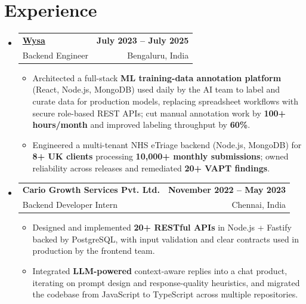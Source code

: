 \documentclass[letterpaper,10pt]{article}
\makeatletter
\newcommand{\resumeItem}[1]{
  \item\small{#1\vspace{-1pt}}
}
\newcommand{\resumeSubheading}[4]{
  \vspace{1pt}\item
    \begin{tabular*}{0.985\textwidth}[t]{l@{\extracolsep{\fill}}r}
      \textbf{#1} & \textbf{\small #2} \\
      {\small\color{ResumeSlate} #3} & {\small\color{ResumeSlate} #4} \\
    \end{tabular*}\vspace{-6pt}
}
\newcommand{\resumeSubHeadingListStart}{\begin{itemize}[leftmargin=0.0in, label={}, itemsep=2pt, topsep=2pt]}
\newcommand{\resumeSubHeadingListEnd}{\end{itemize}}
\newcommand{\resumeItemListStart}{\begin{itemize}[leftmargin=0.18in, itemsep=2pt, topsep=1pt]}
\newcommand{\resumeItemListEnd}{\end{itemize}\vspace{-4pt}}
\makeatother
\begin{document}
\section{Experience}
\resumeSubHeadingListStart
  \resumeSubheading
    {\href{https://www.wysa.io}{Wysa}}{July 2023 -- July 2025}
    {Backend Engineer}{Bengaluru, India}
    \resumeItemListStart
      \resumeItem{Architected a full-stack \textbf{ML training-data annotation platform} (React, Node.js, MongoDB) used daily by the AI team to label and curate data for production models, replacing spreadsheet workflows with secure role-based REST APIs; cut manual annotation work by \textbf{100+ hours/month} and improved labeling throughput by \textbf{60\%}.}
      \resumeItem{Engineered a multi-tenant NHS eTriage backend (Node.js, MongoDB) for \textbf{8+ UK clients} processing \textbf{10{,}000+ monthly submissions}; owned reliability across releases and remediated \textbf{20+ VAPT findings}.}
    \resumeItemListEnd
  \resumeSubheading
    {Cario Growth Services Pvt. Ltd.}{November 2022 -- May 2023}
    {Backend Developer Intern}{Chennai, India}
    \resumeItemListStart
      \resumeItem{Designed and implemented \textbf{20+ RESTful APIs} in Node.js + Fastify backed by PostgreSQL, with input validation and clear contracts used in production by the frontend team.}
      \resumeItem{Integrated \textbf{LLM-powered} context-aware replies into a chat product, iterating on prompt design and response-quality heuristics, and migrated the codebase from JavaScript to TypeScript across multiple repositories.}
    \resumeItemListEnd
\resumeSubHeadingListEnd
\vspace{-4pt}
\end{document}
